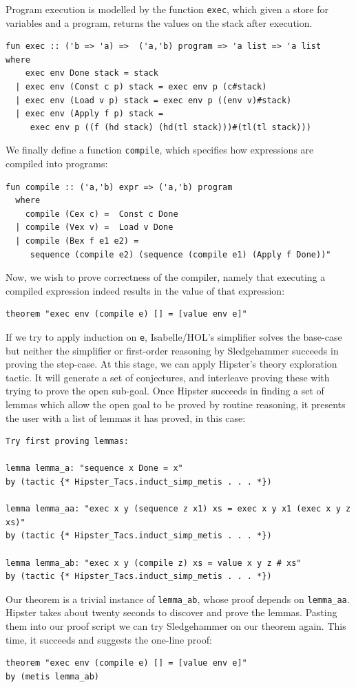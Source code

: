 Program execution is modelled by the function \texttt{exec}, which given a store for variables and a program, returns the values on the stack after execution.
\begin{small}
\begin{verbatim}
fun exec :: ('b => 'a) =>  ('a,'b) program => 'a list => 'a list
where
    exec env Done stack = stack
  | exec env (Const c p) stack = exec env p (c#stack)
  | exec env (Load v p) stack = exec env p ((env v)#stack)
  | exec env (Apply f p) stack =
     exec env p ((f (hd stack) (hd(tl stack)))#(tl(tl stack)))
\end{verbatim}
\end{small}
We finally define a function \texttt{compile}, which specifies how expressions are compiled into programs:
\begin{small}
\begin{verbatim}
fun compile :: ('a,'b) expr => ('a,'b) program
  where
    compile (Cex c) =  Const c Done
  | compile (Vex v) =  Load v Done
  | compile (Bex f e1 e2) =
     sequence (compile e2) (sequence (compile e1) (Apply f Done))"
\end{verbatim}
\end{small}
Now, we wish to prove correctness of the compiler, namely that executing a compiled expression indeed results in the value of that expression: 
\begin{verbatim}
theorem "exec env (compile e) [] = [value env e]"
\end{verbatim}
If we try to apply induction on \texttt{e}, Isabelle/HOL's simplifier solves the base-case but neither the simplifier or first-order reasoning by Sledgehammer succeeds in proving the step-case. At this stage, we can apply Hipster's theory exploration tactic. It will generate a set of conjectures, and interleave proving these with trying to prove the open sub-goal. Once Hipster succeeds in finding a set of lemmas which allow the open goal to be proved by routine reasoning, it presents the user with a list of lemmas it has proved, in this case:
\begin{small}
\begin{verbatim}
Try first proving lemmas:

lemma lemma_a: "sequence x Done = x"
by (tactic {* Hipster_Tacs.induct_simp_metis . . . *})

lemma lemma_aa: "exec x y (sequence z x1) xs = exec x y x1 (exec x y z xs)"
by (tactic {* Hipster_Tacs.induct_simp_metis . . . *})

lemma lemma_ab: "exec x y (compile z) xs = value x y z # xs"
by (tactic {* Hipster_Tacs.induct_simp_metis . . . *})
\end{verbatim}
\end{small}
Our theorem is a trivial instance of \verb|lemma_ab|, whose proof
depends on \verb|lemma_aa|. Hipster takes about twenty seconds to
discover and prove the lemmas.
Pasting them into our proof script we can try Sledgehammer on our theorem again. This time, it succeeds and suggests the one-line proof:%
\begin{verbatim}
theorem "exec env (compile e) [] = [value env e]"
by (metis lemma_ab)
\end{verbatim}
